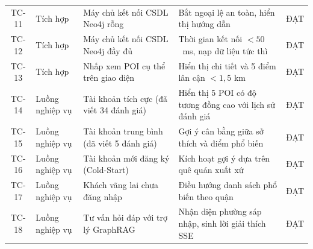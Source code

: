 \documentclass[journal,onecolumn,10pt]{IEEEtran}
\begin{document}
\begin{table}[H]
\begin{tabular}{cp{2.2cm}p{4.6cm}p{5.8cm}c}
TC-11 & Tích hợp & Máy chủ kết nối CSDL Neo4j rỗng & Bắt ngoại lệ an toàn, hiển thị hướng dẫn & ĐẠT \\
TC-12 & Tích hợp & Máy chủ kết nối CSDL Neo4j đầy đủ & Thời gian kết nối $< 50$~ms, nạp dữ liệu tức thì & ĐẠT \\
TC-13 & Tích hợp & Nhấp xem POI cụ thể trên giao diện & Hiển thị chi tiết và 5 điểm lân cận $< 1,5$ km & ĐẠT \\
TC-14 & Luồng nghiệp vụ & Tài khoản tích cực (đã viết 34 đánh giá) & Hiển thị 5 POI có độ tương đồng cao với lịch sử đánh giá & ĐẠT \\
TC-15 & Luồng nghiệp vụ & Tài khoản trung bình (đã viết 5 đánh giá) & Gợi ý cân bằng giữa sở thích và điểm phổ biến & ĐẠT \\
TC-16 & Luồng nghiệp vụ & Tài khoản mới đăng ký (Cold-Start) & Kích hoạt gợi ý dựa trên quê quán xuất xứ & ĐẠT \\
TC-17 & Luồng nghiệp vụ & Khách vãng lai chưa đăng nhập & Điều hướng danh sách phổ biến theo quận & ĐẠT \\
TC-18 & Luồng nghiệp vụ & Tư vấn hỏi đáp với trợ lý GraphRAG & Nhận diện phường sáp nhập, sinh lời giải thích SSE & ĐẠT \\
\bottomrule
\end{tabular}
\end{table}
\end{document}
